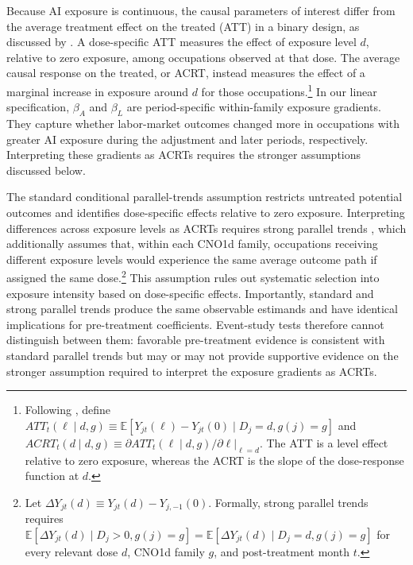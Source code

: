 \documentclass[11pt]{article}
\begin{document}
Because AI exposure is continuous, the causal parameters of interest differ from the average treatment effect on the treated (ATT) in a binary design, as discussed by \citet{callaway_goodmanbacon_santanna_2024}. A dose-specific ATT measures the effect of exposure level \(d\), relative to zero exposure, among occupations observed at that dose. The average causal response on the treated, or ACRT, instead measures the effect of a marginal increase in exposure around \(d\) for those occupations.\footnote{Following \citet{callaway_goodmanbacon_santanna_2024}, define \(ATT_t(\ell\mid d,g)\equiv\mathbb{E}[Y_{jt}(\ell)-Y_{jt}(0)\mid D_j=d,g(j)=g]\) and \(ACRT_t(d\mid d,g)\equiv\left.\partial ATT_t(\ell\mid d,g)/\partial\ell\right|_{\ell=d}\). The ATT is a level effect relative to zero exposure, whereas the ACRT is the slope of the dose-response function at \(d\).} In our linear specification, \(\beta_A\) and \(\beta_L\) are period-specific within-family exposure gradients. They capture whether labor-market outcomes changed more in occupations with greater AI exposure during the adjustment and later periods, respectively. Interpreting these gradients as ACRTs requires the stronger assumptions discussed below.

The standard conditional parallel-trends assumption restricts untreated potential outcomes and identifies dose-specific effects relative to zero exposure. Interpreting differences across exposure levels as ACRTs requires strong parallel trends \citep{callaway_goodmanbacon_santanna_2024}, which additionally assumes that, within each CNO1d family, occupations receiving different exposure levels would experience the same average outcome path if assigned the same dose.\footnote{Let \(\Delta Y_{jt}(d)\equiv Y_{jt}(d)-Y_{j,-1}(0)\). Formally, strong parallel trends requires \(\mathbb{E}[\Delta Y_{jt}(d)\mid D_j>0,g(j)=g]=\mathbb{E}[\Delta Y_{jt}(d)\mid D_j=d,g(j)=g]\) for every relevant dose \(d\), CNO1d family \(g\), and post-treatment month \(t\).} This assumption rules out systematic selection into exposure intensity based on dose-specific effects. Importantly, standard and strong parallel trends produce the same observable estimands and have identical implications for pre-treatment coefficients. Event-study tests therefore cannot distinguish between them: favorable pre-treatment evidence is consistent with standard parallel trends but may or may not provide supportive evidence on the stronger assumption required to interpret the exposure gradients as ACRTs.
\end{document}
